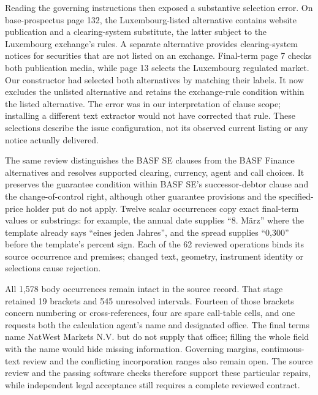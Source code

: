 Reading the governing instructions then exposed a substantive selection error.
On base-prospectus page 132, the Luxembourg-listed alternative contains website
publication and a clearing-system substitute, the latter subject to the
Luxembourg exchange's rules. A separate alternative provides clearing-system
notices for securities that are not listed on an exchange. Final-term page 7
checks both publication media, while page 13 selects the Luxembourg regulated
market. Our constructor had selected both alternatives by matching their labels.
It now excludes the unlisted alternative and retains the exchange-rule condition
within the listed alternative. The error was in our interpretation of clause
scope; installing a different text extractor would not have corrected that rule.
These selections describe the issue configuration, not its observed current
listing or any notice actually delivered.

The same review distinguishes the BASF SE clauses from the BASF Finance
alternatives and resolves supported clearing, currency, agent and call choices.
It preserves the guarantee condition within BASF SE's successor-debtor clause
and the change-of-control right, although other guarantee provisions and the
specified-price holder put do not apply. Twelve scalar occurrences copy exact
final-term values or substrings: for example, the annual date supplies
``8. März'' where the template already says ``eines jeden Jahres'', and the
spread supplies ``0,300'' before the template's percent sign. Each of the 62
reviewed operations binds its source occurrence and premises; changed text,
geometry, instrument identity or selections cause rejection.

All 1,578 body occurrences remain intact in the source record. That stage
retained 19 brackets and 545 unresolved intervals. Fourteen of those
brackets concern numbering or cross-references, four are spare call-table cells,
and one requests both the calculation agent's name and designated office. The
final terms name NatWest Markets N.V. but do not supply that office; filling
the whole field with the name would hide missing information. Governing margins,
continuous-text review and the conflicting incorporation ranges also remain
open. The source review and the passing software checks therefore support these
particular repairs, while independent legal acceptance still requires a complete
reviewed contract.

